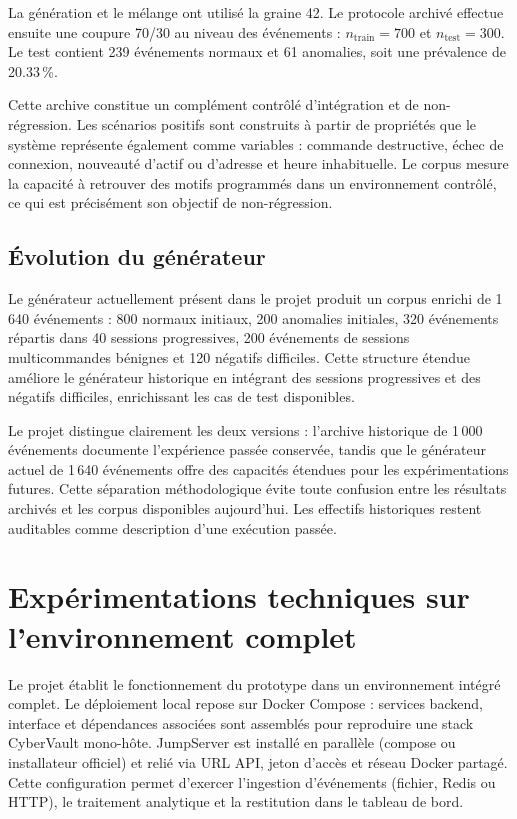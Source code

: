\documentclass[11pt,a4paper,oneside]{report}
\theoremstyle{definition}
\theoremstyle{plain}
\begin{document}
La génération et le mélange ont utilisé la graine 42. Le protocole archivé
effectue ensuite une coupure 70/30 au niveau des événements :
$n_{\mathrm{train}}=700$ et $n_{\mathrm{test}}=300$. Le test contient 239
événements normaux et 61 anomalies, soit une prévalence de 20.33\,\%.

Cette archive constitue un complément contrôlé d'intégration et de
non-régression. Les scénarios positifs sont construits à partir de propriétés
que le système représente également comme variables : commande destructive,
échec de connexion, nouveauté d'actif ou d'adresse et heure inhabituelle.
Le corpus mesure la capacité à retrouver des motifs programmés dans un
environnement contrôlé, ce qui est précisément son objectif de non-régression.

\subsection{Évolution du générateur}

Le générateur actuellement présent dans le projet produit un corpus enrichi de
1\,640 événements : 800 normaux initiaux, 200 anomalies initiales, 320
événements répartis dans 40 sessions progressives, 200 événements de sessions
multicommandes bénignes et 120 négatifs difficiles. Cette structure étendue
améliore le générateur historique en intégrant des sessions progressives et
des négatifs difficiles, enrichissant les cas de test disponibles.

Le projet distingue clairement les deux versions : l'archive historique de
1\,000 événements documente l'expérience passée conservée, tandis que le
générateur actuel de 1\,640 événements offre des capacités étendues pour les
expérimentations futures. Cette séparation méthodologique évite toute confusion
entre les résultats archivés et les corpus disponibles aujourd'hui. Les
effectifs historiques restent auditables comme description d'une exécution
passée.

\section{Expérimentations techniques sur l'environnement complet}
\label{sec:experiments-technical}

Le projet établit le fonctionnement du prototype dans un environnement
intégré complet. Le déploiement local repose sur Docker Compose : services
backend, interface et dépendances associées sont assemblés pour reproduire
une stack CyberVault mono-hôte. JumpServer est installé en parallèle (compose
ou installateur officiel) et relié via URL API, jeton d'accès et réseau
Docker partagé. Cette configuration permet d'exercer l'ingestion d'événements
(fichier, Redis ou HTTP), le traitement analytique et la restitution dans le
tableau de bord.
\end{document}
